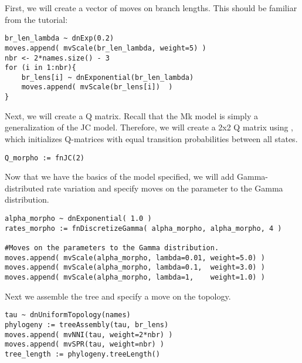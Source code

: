 First, we will create a vector of moves on branch lengths. 
This should be familiar from the  tutorial:
{\tt \begin{snugshade*}
\begin{lstlisting}
br_len_lambda ~ dnExp(0.2)
moves.append( mvScale(br_len_lambda, weight=5) )
nbr <- 2*names.size() - 3
for (i in 1:nbr){
    br_lens[i] ~ dnExponential(br_len_lambda)
    moves.append( mvScale(br_lens[i])  )
}
\end{lstlisting}
\end{snugshade*}}

Next, we will create a Q matrix. 
Recall that the Mk model is simply a generalization of the JC model.
Therefore, we will create a 2x2 Q matrix using , which initializes Q-matrices with equal transition probabilities between all states.

{\tt \begin{snugshade*}
\begin{lstlisting}
Q_morpho := fnJC(2)
\end{lstlisting}
\end{snugshade*}}

Now that we have the basics of the model specified, we will add Gamma-distributed rate variation and specify moves on the parameter to the Gamma distribution.


{\tt \begin{snugshade*}
\begin{lstlisting}
alpha_morpho ~ dnExponential( 1.0 )
rates_morpho := fnDiscretizeGamma( alpha_morpho, alpha_morpho, 4 )

#Moves on the parameters to the Gamma distribution.
moves.append( mvScale(alpha_morpho, lambda=0.01, weight=5.0) )
moves.append( mvScale(alpha_morpho, lambda=0.1,  weight=3.0) )
moves.append( mvScale(alpha_morpho, lambda=1,    weight=1.0) )
\end{lstlisting}
\end{snugshade*}}

Next we assemble the tree and specify a move on the topology.

{\tt \begin{snugshade*}
\begin{lstlisting}
tau ~ dnUniformTopology(names)
phylogeny := treeAssembly(tau, br_lens)
moves.append( mvNNI(tau, weight=2*nbr) )
moves.append( mvSPR(tau, weight=nbr) )
tree_length := phylogeny.treeLength()
\end{lstlisting}
\end{snugshade*}}

